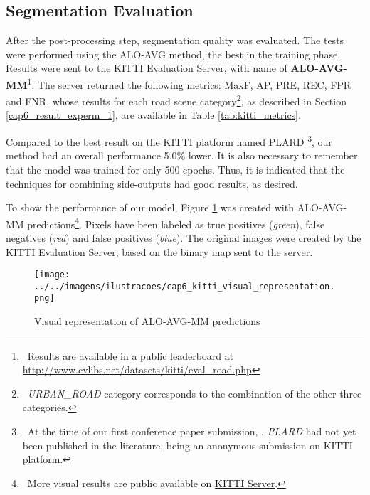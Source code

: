\subsection{Segmentation Evaluation}
\label{cap6_resultados_segmentacao}

After the post-processing step, segmentation quality was evaluated.
The tests were performed using the ALO-AVG method, the best in the training phase.
Results were sent to  the KITTI Evaluation Server, with name of \textbf{ALO-AVG-MM}\footnote{~Results are available in a public leaderboard at \url{http://www.cvlibs.net/datasets/kitti/eval_road.php}}.
The server returned the following metrics: MaxF, AP, PRE, REC, FPR and FNR, whose results for each road scene category\footnote{~\textit{URBAN\_ROAD} category corresponds to the combination of the other three categories.}, as described in Section \ref{cap6_result_experm_1}, are available in Table \ref{tab:kitti_metrics}.



Compared to the best result on the KITTI platform named PLARD \cite{Chen:2019}\footnote{~At the time of our first conference paper submission, \cite{Reis:2019}, \textit{PLARD} had not yet been published in the literature, being an anonymous submission on KITTI platform.}, our method had an overall performance 5.0\% lower.
It is also necessary to remember that the model was trained for only 500 epochs.
Thus, it is indicated that the techniques for combining side-outputs had good results, as desired.

To show the performance of our model, Figure \ref{fig:kitti_representacao_visual} was created with ALO-AVG-MM predictions\footnote{~More visual results are public available on \href{http://www.cvlibs.net/datasets/kitti/eval_road_detail.php?result=a5ca173550cb383caf3e12ca236d7c809489d2d9}{KITTI Server}.}.
Pixels have been labeled as true positives (\textit{green}), false negatives (\textit{red}) and false positives (\textit{blue}).
The original images were created by the KITTI Evaluation Server, based on the binary map sent to the server.

\begin{figure}
  \centering
  \caption{Visual representation of ALO-AVG-MM predictions}
  \texttt{[image: ../../imagens/ilustracoes/cap6\_kitti\_visual\_representation.png]}
  \sourceOwn
  \label{fig:kitti_representacao_visual}
\end{figure}
